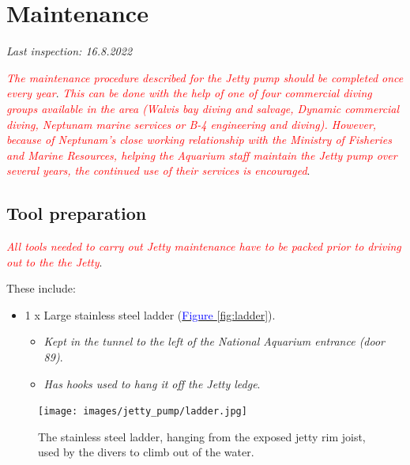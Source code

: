 \documentclass[
  12pt,
]{report}
\providecommand{\tightlist}{%
  \setlength{\itemsep}{0pt}\setlength{\parskip}{0pt}}\usepackage{longtable,booktabs,array}
\begin{document}
\hypertarget{maintenance}{%
\section{Maintenance}\label{maintenance}}

\emph{Last inspection: 16.8.2022}

\emph{\textcolor{red}{The maintenance procedure described for the Jetty pump should be completed once every year}}.
\emph{\textcolor{red}{This can be done with the help of one of four commercial diving groups available in the area (Walvis bay diving and salvage, Dynamic commercial diving, Neptunam marine services or B-4 engineering and diving). However, because of Neptunam's close working relationship with the Ministry of Fisheries and Marine Resources, helping the Aquarium staff maintain the Jetty pump over several years, the continued use of their services is encouraged}}.

\hypertarget{tool-preparation-3}{%
\subsection{\texorpdfstring{Tool preparation
\label{pump-tools}}{Tool preparation }}\label{tool-preparation-3}}

\emph{\textcolor{red}{All tools needed to carry out Jetty maintenance have to be packed prior to driving out to the the Jetty}}.

These include:

\begin{itemize}
\tightlist
\item
  1 x Large stainless steel ladder
  (\ul{\textcolor{blue}{Figure \ref{fig:ladder}}}).

  \begin{itemize}
  \tightlist
  \item
    \emph{Kept in the tunnel to the left of the National Aquarium
    entrance (door 89)}.
  \item
    \emph{Has hooks used to hang it off the Jetty ledge}.
  \end{itemize}
\end{itemize}

\begin{figure}[H]

{\centering \texttt{[image: images/jetty\_pump/ladder.jpg]}

}

\caption{The stainless steel ladder, hanging from the exposed jetty rim
joist, used by the divers to climb out of the water.}

\end{figure}
\end{document}
